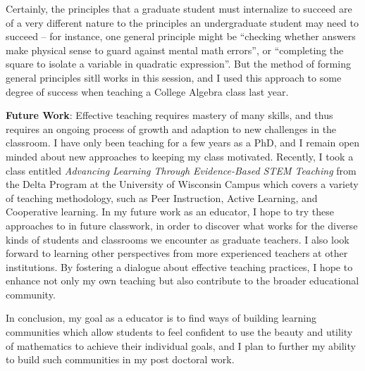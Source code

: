 \documentclass[11pt]{article}
\begin{document}
Certainly, the principles that a graduate student must internalize to succeed are of a very different nature to the principles an undergraduate student may need to succeed -- for instance, one general principle might be ``checking whether answers make physical sense to guard against mental math errors'', or ``completing the square to isolate a variable in quadratic expression''. But the method of forming general principles sitll works in this session, and I used this approach to some degree of success when teaching a College Algebra class last year.

{\bf Future Work}: Effective teaching requires mastery of many skills, and thus requires an ongoing process of growth and adaption to new challenges in the classroom. I have only been teaching for a few years as a PhD, and I remain open minded about new approaches to keeping my class motivated. Recently, I took a class entitled \emph{Advancing Learning Through Evidence-Based STEM Teaching} from the Delta Program at the University of Wisconsin Campus which covers a variety of teaching methodology, such as Peer Instruction, Active Learning, and Cooperative learning. In my future work as an educator, I hope to try these approaches to in future classwork, in order to discover what works for the diverse kinds of students and classrooms we encounter as graduate teachers. I also look forward to learning other perspectives from more experienced teachers at other institutions. By fostering a dialogue about effective teaching practices, I hope to enhance not only my own teaching but also contribute to the broader educational community.

In conclusion, my goal as a educator is to find ways of building learning communities which allow students to feel confident to use the beauty and utility of mathematics to achieve their individual goals, and I plan to further my ability to build such communities in my post doctoral work.
\end{document}
